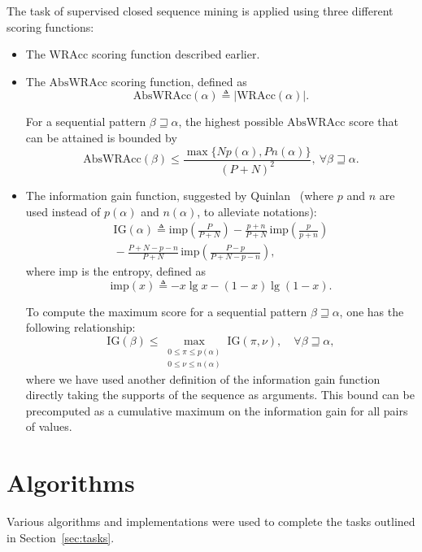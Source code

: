 \documentclass{sigkddExp}
\newcommand{\abs}[1]{|#1|}
\newcommand{\wracc}{\mathrm{WRAcc}}
\newcommand{\abswracc}{\mathrm{AbsWRAcc}}
\newcommand{\ig}{\mathrm{IG}}
\newcommand{\imp}{\mathrm{imp}}
\begin{document}
The task of supervised closed sequence mining is applied using three different scoring functions:
\begin{itemize}
	\item The \(\wracc\) scoring function described earlier.
	\item The \(\abswracc\) scoring function, defined as
	\begin{equation}
	\abswracc(\alpha) \triangleq \abs{\wracc(\alpha)}.
	\end{equation}
	
	For a sequential pattern \(\beta \sqsupseteq \alpha\), the highest possible \(\abswracc\) score that can be attained is bounded by
	\begin{equation}
	\abswracc(\beta) \leqslant \frac{\max\{N p(\alpha), P n(\alpha)\}}{(P + N)^2}, \ \forall \beta \sqsupseteq \alpha.
	\end{equation}
	\item The information gain function, suggested by Quinlan~\cite{Quinlan1986} (where \(p\) and \(n\) are used instead of \(p(\alpha)\) and \(n(\alpha)\), to alleviate notations):
	\begin{multline}
	\ig(\alpha) \triangleq \imp\left(\frac{P}{P + N}\right) - \frac{p + n}{P + N}\, \imp\left(\frac{p}{p + n}\right) \\
	{} - \frac{P + N - p - n}{P + N}\, \imp\left(\frac{P - p}{P + N - p - n}\right),
	\end{multline}
	where \(\imp\) is the entropy, defined as
	\begin{equation}
	\imp(x) \triangleq - x \lg x - (1-x) \lg (1-x).
	\end{equation}
	
	To compute the maximum score for a sequential pattern \(\beta \sqsupseteq \alpha\), one has the following relationship:
	\begin{equation}
	\ig(\beta) \leqslant \max_{\substack{0 \leqslant \pi \leqslant p(\alpha) \\ 0 \leqslant \nu \leqslant n(\alpha)}} \ig(\pi, \nu), \quad \forall \beta \sqsupseteq \alpha,
	\end{equation}
	where we have used another definition of the information gain function directly taking the supports of the sequence as arguments.
	This bound can be precomputed as a cumulative maximum on the information gain for all pairs of values.
\end{itemize}

\section{Algorithms}
Various algorithms and implementations were used to complete the tasks outlined in Section~\ref{sec:tasks}.
\end{document}
